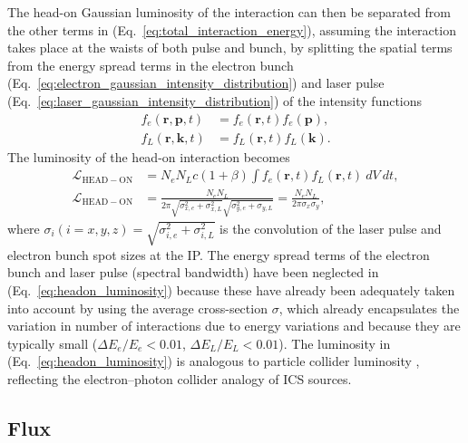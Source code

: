 \documentclass[../main.tex]{subfiles}
\begin{document}
The head-on Gaussian luminosity of the interaction can then be separated from the other terms in (Eq.~\ref{eq:total_interaction_energy}), assuming the interaction takes place at the waists of both pulse and bunch, by splitting the spatial terms from the energy spread terms in the electron bunch (Eq.~\ref{eq:electron_gaussian_intensity_distribution}) and laser pulse (Eq.~\ref{eq:laser_gaussian_intensity_distribution}) of the intensity functions
\begin{align}
f_{e}\left(\boldsymbol{r},\boldsymbol{p},t\right) &= f_{e}\left(\boldsymbol{r},t\right)f_{e}\left(\boldsymbol{p}\right), \\  
f_{L}\left(\boldsymbol{r},\boldsymbol{k},t\right) &= f_{L}\left(\boldsymbol{r},t\right)f_{L}\left(\boldsymbol{k}\right).
\label{eq:spartial_energy_term_split}
\end{align}
The luminosity of the head-on interaction becomes
\begin{align}
\mathcal{L}_{\mathrm{HEAD-ON}} &= N_{e}N_{L}c\left(1+\beta\right)\int f_{e}\left(\boldsymbol{r},t\right)f_{L}\left(\boldsymbol{r},t\right)~dV~dt, \\
\mathcal{L}_{\mathrm{HEAD-ON}} &= \frac{N_{e}N_{L}}{2\pi\sqrt{\sigma_{x,e}^{2}+\sigma_{x,L}^{2}}\sqrt{\sigma_{y,e}^{2}+\sigma_{y,L}}} = \frac{N_{e}N_{L}}{2\pi\sigma_{x}\sigma_{y}},
\label{eq:headon_luminosity}
\end{align}
where $\sigma_{i}(i=x,y,z) = \sqrt{\sigma_{i,e}^{2}+\sigma_{i,L}^{2}}$ is the convolution of the laser pulse and electron bunch spot sizes at the IP. The energy spread terms of the electron bunch and laser pulse (spectral bandwidth) have been neglected in (Eq.~\ref{eq:headon_luminosity}) because these have already been adequately taken into account by using the average cross-section $\sigma$, which already encapsulates the variation in number of interactions due to energy variations and because they are typically small ($\Delta E_{e}/E_{e} < 0.01$, $\Delta E_{L}/E_{L} < 0.01$). The luminosity in (Eq.~\ref{eq:headon_luminosity}) is analogous to particle collider luminosity \cite{herr2006concept,miyahara2008luminosity}, reflecting the electron--photon collider analogy of ICS sources.

\subsection{Flux}
\end{document}
